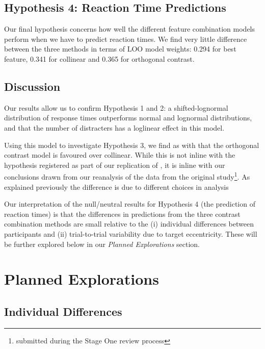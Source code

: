 \documentclass[preprint,12pt,authoryear]{elsarticle}
\begin{document}
\subsection{Hypothesis 4: Reaction Time Predictions}

Our final hypothesis concerns how well the different feature combination models perform when we have to predict reaction times. We find very little difference between the three methods in terms of LOO model weights: 0.294 for best feature, 0.341 for collinear and 0.365 for orthogonal contrast. 

\subsection{Discussion}

Our results allow us to confirm Hypothesis 1 and 2: a shifted-lognormal distribution of response times outperforms normal and lognormal distributions, and that the number of distracters has a loglinear effect in this model. 

Using this model to investigate Hypothesis 3, we find as with that the orthogonal contrast model is favoured over collinear. While this is not inline with the hypothesis registered as part of our replication of \cite{buetti2019predicting}, it is inline with our conclusions drawn from our reanalysis of the data from the original study\footnote{submitted during the Stage One review process}. As explained previously the difference is due to different choices in analysis

Our interpretation of the null/neutral results for Hypothesis 4 (the prediction of reaction times) is that the differences in predictions from the three contrast combination methods are small relative to the (i) individual differences between participants and (ii) trial-to-trial variability due to target eccentricity. These will be further explored below in our \textit{Planned Explorations} section.

\section{Planned Explorations}

\subsection{Individual Differences}
\end{document}
